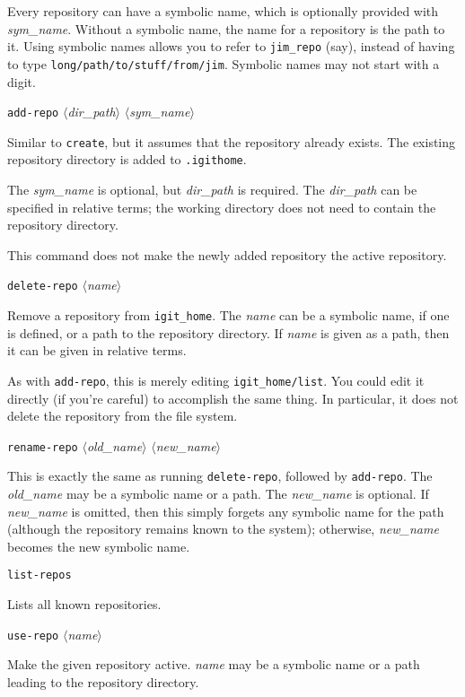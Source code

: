 \documentclass[10pt]{article}
\newcommand{\itarg}[1]{\textit{$\langle$#1$\rangle$}}
\begin{document}
{\begin{hang}
Every repository can have a symbolic name, which is optionally provided
with {\it sym\_name}. Without a symbolic name, the name for a
repository is the path to it. Using symbolic names allows you to refer to
\verb=jim_repo= (say), instead of having to type
\verb=long/path/to/stuff/from/jim=. Symbolic names may not start with a digit.
\end{hang}

{\tt add-repo} \itarg{dir\_path} \itarg{sym\_name}
\begin{hang}
Similar to {\tt create}, but it assumes that the repository already
exists. The existing repository directory is added to {\tt .igithome}.
  
The {\it sym\_name} is optional, but {\it dir\_path} is
required. The {\it dir\_path} can be specified in relative terms;
the working directory does not need to contain the repository directory.
   
This command does not make the newly added repository the active repository.
\end{hang}
  
{\tt delete-repo} \itarg{name}
\begin{hang}
Remove a repository from {\tt igit\_home}. The {\it name} can be a
symbolic name, if one is defined, or a path to the repository
directory. If {\it name} is given as a path, then it can be given
in relative terms. 
  
As with {\tt add-repo}, this is merely editing {\tt igit\_home/list}.
You could edit it directly (if you're careful) to accomplish the same thing.
In particular, it does not delete the repository from the file system.
\end{hang}

{\tt rename-repo} \itarg{old\_name} \itarg{new\_name}
\begin{hang}
This is exactly the same as running {\tt delete-repo}, followed by
{\tt add-repo}. The {\it old\_name} may be a symbolic name or a path. The
{\it new\_name} is optional. If {\it new\_name} is omitted, then this
simply forgets any symbolic name for the path (although the repository
remains known to the system); otherwise, {\it new\_name} becomes the
new symbolic name. 
\end{hang}
\pagebreak
{\tt list-repos}
\begin{hang}
Lists all known repositories.
\end{hang}

{\tt use-repo} \itarg{name}
\begin{hang}
Make the given repository active. {\it name} may be a symbolic name
or a path leading to the repository directory.
\end{hang}

}
\end{document}
